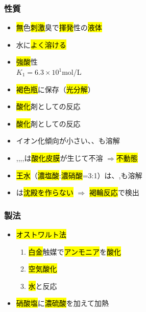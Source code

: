 \subsubsection{性質}
\begin{itemize}
      \item \hl{無}色\hl{刺激}臭で\hl{揮発}性の\hl{液体}
      \item 水に\hl{よく溶ける}
      \item \hl{強酸}性\\
            \hl{} \hfill $K_{1}=6.3\times10^1$mol/L
      \item \hl{褐色瓶}に保存（\hl{光分解}）
      \item \hl{酸化}剤としての反応 \\
      \item \hl{酸化}剤としての反応 \\
      \item イオン化傾向が小さい、、も溶解
      \item \hl{},\hl{},\hl{},\hl{},\hl{}は\hl{酸化皮膜}が生じて不溶 $\Rightarrow$\hl{不動態}
      \item \hl{王水}（\hl{濃塩酸}:\hl{濃硝酸}=3:1）は、,も溶解
      \item {}は\hl{沈殿を作らない} $\Rightarrow$ \hl{褐輪反応}で検出
\end{itemize}
\subsubsection{製法}
\begin{itemize}
      \item \hl{オストワルト法}\\
            \begin{enumerate}
                  \item \hl{白金}触媒で\hl{アンモニア}を\hl{酸化}\\
                  \item \hl{空気酸化}\\
                  \item \hl{水}と反応\\
            \end{enumerate}
      \item \hl{硝酸塩}に\hl{濃硫酸}を加えて加熱\\
\end{itemize}

